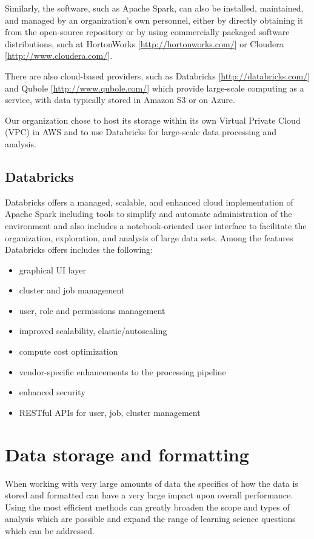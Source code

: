 \documentclass[runningheads,a4paper]{llncs}
\begin{document}
Similarly, the software, such as Apache Spark, can also be installed, maintained, and managed by an organization's own personnel, either by directly obtaining it from the open-source repository or by using  commercially packaged software distributions, such at HortonWorks [\url{http://hortonworks.com/}] or Cloudera [\url{http://www.cloudera.com/}].

There are also cloud-based providers, such as Databricks [\url{http://databricks.com/}] and Qubole [\url{http://www.qubole.com/}] which provide large-scale computing as a service, with data typically stored in Amazon S3 or on Azure.

Our organization chose to host its storage within its own Virtual Private Cloud (VPC) in AWS and to use Databricks for large-scale data processing and analysis.

\subsection{Databricks}

Databricks offers a managed, scalable, and enhanced cloud implementation of Apache Spark including tools to simplify and automate administration of the environment and also includes a notebook-oriented user interface to facilitate the organization, exploration, and analysis of large data sets.  Among the features Databricks offers includes the following:

\begin{itemize}
\item graphical UI layer
\item cluster and job management
\item  user, role and permissions management
\item  improved scalability, elastic/autoscaling
\item  compute cost optimization
\item  vendor-specific enhancements to the processing pipeline
\item  enhanced security
\item  RESTful APIs for user, job, cluster management
\end{itemize}

\section{Data storage and formatting}

When working with very large amounts of data the specifics of how the data is stored and formatted can have a very large impact upon overall performance.  Using the most efficient methods can greatly broaden the scope and types of analysis which are possible and expand the range of learning science questions which can be addressed.
\end{document}
